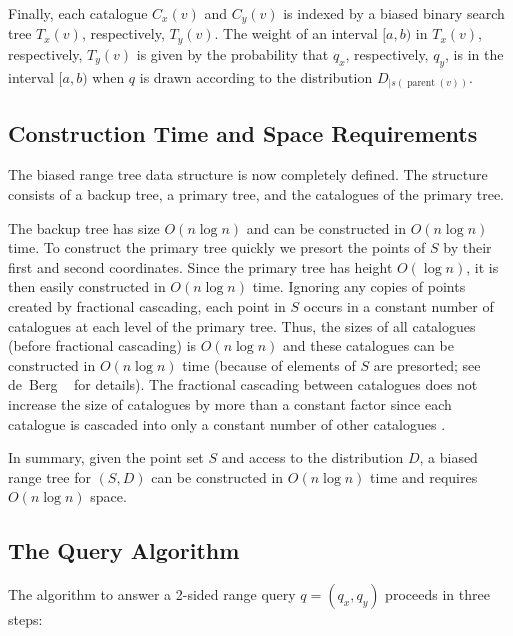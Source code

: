 \documentclass[lotsofwhite,charterfonts]{patmorin}
\DeclareMathOperator{\prnt}{parent}
\begin{document}
Finally, each catalogue $C_x(v)$ and $C_y(v)$ is indexed by a biased
binary search tree $T_x(v)$, respectively, $T_y(v)$.  The weight of an
interval $[a,b)$ in $T_x(v)$, respectively, $T_y(v)$ is given by the
probability that $q_x$, respectively, $q_y$, is in the interval
$[a,b)$ when $q$ is drawn according to the distribution $D_{\mid
s(\prnt(v))}$.

\subsection{Construction Time and Space Requirements}

The biased range tree data structure is now completely defined.  The
structure consists of a backup tree, a primary tree, and the
catalogues of the primary tree.

The backup tree has size $O(n\log n)$ and can be constructed in
$O(n\log n)$ time.  To construct the primary tree quickly we presort
the points of $S$ by their first and second coordinates.  Since the
primary tree has height $O(\log n)$, it is then easily constructed in
$O(n\log n)$ time. 
Ignoring any copies of points created by fractional cascading,
each point in $S$ occurs in a constant number of catalogues at each
level of the primary tree.  Thus, the sizes of all catalogues (before
fractional cascading) is $O(n\log n)$ and these catalogues can be
constructed in $O(n\log n)$ time (because of elements of $S$ are
presorted; see de~Berg \etal\ \cite{bkos97} for details).  The
fractional cascading between catalogues does not increase the size of
catalogues by more than a constant factor since each catalogue is
cascaded into only a constant number of other catalogues \cite{ae76}.

In summary, given the point set $S$ and access to the distribution
$D$, a biased range tree for $(S,D)$ can be constructed in $O(n\log
n)$ time and requires $O(n\log n)$ space.


\subsection{The Query Algorithm}

The algorithm to answer a 2-sided range query $q=(q_x,q_y)$ proceeds
in three steps:
\end{document}
